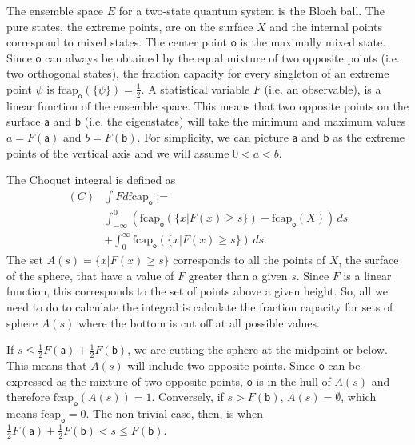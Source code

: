 \documentclass[10pt,twocolumn, nofootinbib]{revtex4-2}
\newcommand\frcap{\mathrm{fcap}}
\newcommand{\ens}[1][e] {\mathsf{#1}} %
\begin{document}
The ensemble space $E$ for a two-state quantum system is the Bloch ball. The pure states, the extreme points, are on the surface $X$ and the internal points correspond to mixed states. The center point $\ens[o]$ is the maximally mixed state. Since $\ens[o]$ can always be obtained by the equal mixture of two opposite points (i.e. two orthogonal states), the fraction capacity for every singleton of an extreme point $\psi$ is $\frcap_{\ens[o]}(\{\psi\}) =\frac{1}{2}$. A statistical variable $F$ (i.e. an observable), is a linear function of the ensemble space. This means that two opposite points on the surface $\ens[a]$ and $\ens[b]$ (i.e. the eigenstates) will take the minimum and maximum values $a = F(\ens[a])$ and $b = F(\ens[b])$. For simplicity, we can picture $\ens[a]$ and $\ens[b]$ as the extreme points of the vertical axis and we will assume $0<a<b$.

The Choquet integral is defined as 
\begin{equation}
	\begin{aligned}
(C)&\int F d\frcap_{\ens[o]} := \\
&\int_{-\infty}^0
(\frcap_{\ens[o]} (\{x | F (x) \geq s\})-\frcap_{\ens[o]}(X))\, ds \\
&+
\int^\infty_0
\frcap_{\ens[o]} (\{x | F (x) \geq s\})\, ds.
	\end{aligned}
\end{equation}
The set $A(s) = \{x | F (x) \geq s\}$ corresponds to all the points of $X$, the surface of the sphere, that have a value of $F$ greater than a given $s$. Since $F$ is a linear function, this corresponds to the set of points above a given height. So, all we need to do to calculate the integral is calculate the fraction capacity for sets of sphere $A(s)$ where the bottom is cut off at all possible values.

If $s\leq \frac{1}{2} F(\ens[a]) + \frac{1}{2} F(\ens[b])$, we are cutting the sphere at the midpoint or below. This means that $A(s)$ will include two opposite points. Since $\ens[o]$ can be expressed as the mixture of two opposite points, $\ens[o]$ is in the hull of $A(s)$ and therefore $\frcap_{\ens[o]}(A(s)) = 1$. Conversely, if $s > F(\ens[b])$, $A(s) = \emptyset$, which means $\frcap_{\ens[o]} = 0$. The non-trivial case, then, is when $\frac{1}{2} F(\ens[a]) + \frac{1}{2} F(\ens[b]) < s \leq F(\ens[b])$.
\end{document}
